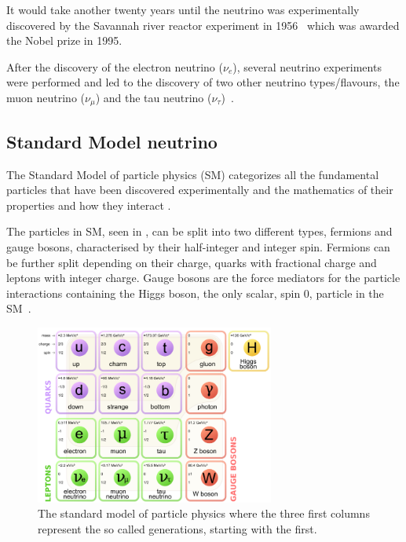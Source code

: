 It would take another twenty years until the neutrino was experimentally discovered by the Savannah river reactor experiment in 1956~\cite{6Reines} which was awarded the Nobel prize in 1995.

After the discovery of the electron neutrino ($\nu_e$), several neutrino experiments were performed and led to the discovery of two other neutrino types/flavours, the muon neutrino ($\nu_\mu$) and the tau neutrino ($\nu_\tau$)~\cite{7Danby, 8Perl, Fix1}.

\subsection{Standard Model neutrino}\label{subsection:SMN}
The Standard Model of particle physics (SM) categorizes all the fundamental particles that have been discovered experimentally and the mathematics of their properties and how they interact \cite{32Burchan:1995, 38griffiths}. 

The particles in SM, seen in , can be split into two different types, fermions and gauge bosons, characterised by their half-integer and integer spin. Fermions can be further split depending on their charge, quarks with fractional charge and leptons with integer charge. Gauge bosons are the force mediators for the particle interactions containing the Higgs boson, the only scalar, spin 0, particle in the SM~\cite{35Higgs}.

\begin{figure}[h!]
\includegraphics[width=0.7\textwidth]{figures/Standard_Model_of_Elementary_Particles.png}
\caption{The standard model of particle physics where the three first columns represent the so called generations, starting with the first. \cite{33wiki1:Online}}
 \label{fig:standardModel}
\end{figure}


